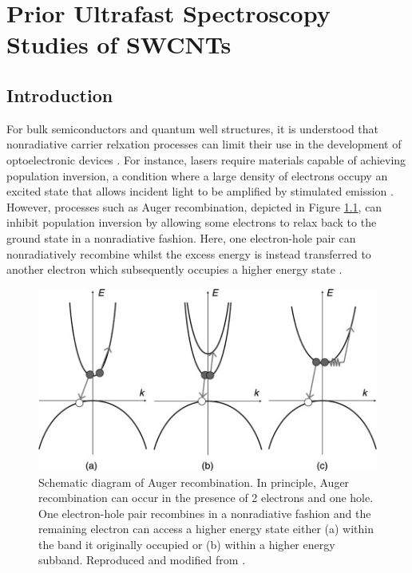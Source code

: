 \chapter{Prior Ultrafast Spectroscopy Studies of SWCNTs}

\section{Introduction}

For bulk semiconductors and quantum well structures, it is understood that nonradiative carrier relxation processes can limit their use in the development of optoelectronic devices \cite{agrawal1986long, roulston1990bipolar, green1995silicon}. For instance, lasers require materials capable of achieving population inversion, a condition where a large density of electrons occupy an excited state that allows incident light to be amplified by stimulated emission \cite{agrawal1986long, siegman1986lasers}. However, processes such as Auger recombination, depicted in Figure \ref{fig:auger_recomb_meyaard}, can inhibit population inversion by allowing some electrons to relax back to the ground state in a nonradiative fashion. Here, one electron-hole pair can nonradiatively recombine whilst the excess energy is instead transferred to another electron which subsequently occupies a higher energy state \cite{beattie1959auger}.

\begin{figure}
	\centering
	\includegraphics[trim = 0 0 3.2cm 0, clip]{images/chapter_prior_works/auger_schematic_meyaard}
	\caption{Schematic diagram of Auger recombination. In principle, Auger recombination can occur in the presence of 2 electrons and one hole. One electron-hole pair recombines in a nonradiative fashion and the remaining electron can access a higher energy state either (a) within the band it originally occupied or (b) within a higher energy subband. Reproduced and modified from \cite{meyaard2014efficiency}. }
	\label{fig:auger_recomb_meyaard}
\end{figure}

